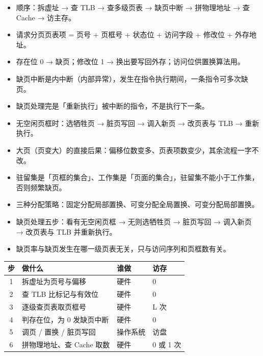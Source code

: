 \documentclass[10pt,a4paper]{ctexart}
\begin{document}
\begin{itemize}

\item 顺序：拆虚址 → 查 TLB → 查多级页表 → 缺页中断 → 拼物理地址 → 查 Cache → 访主存。

\item 请求分页页表项 = 页号 + 页框号 + 状态位 + 访问字段 + 修改位 + 外存地址。

\item 存在位 0 → 缺页；修改位 1 → 换出要写回外存；访问位供置换算法用。

\item 缺页中断是内中断（内部异常），发生在指令执行期间，一条指令可多次缺页。

\item 缺页处理完是「重新执行」被中断的指令，不是执行下一条。

\item 无空闲页框时：选牺牲页 → 脏页写回 → 调入新页 → 改页表与 TLB → 重新执行。

\item 大页（页变大）的直接后果：偏移位数变多、页表项数变少，其余流程一字不改。

\item 驻留集是「页框的集合」、工作集是「页面的集合」，驻留集不能小于工作集，否则频繁缺页。

\item 三种分配策略：固定分配局部置换、可变分配全局置换、可变分配局部置换。

\item 缺页处理五步：看有无空闲页框 → 无则选牺牲页 → 脏页写回 → 调入新页 → 改页表与 TLB 并重新执行。

\item 缺页率与缺页发生在哪一级页表无关，只与访问序列和页框数有关。

\end{itemize}

\begin{center}\small
\begin{tabularx}{\linewidth}{@{}c>{\raggedright\arraybackslash}Xll@{}}
\toprule
步 & 做什么 & 谁做 & 访存 \\
\midrule
1 & 拆虚址为页号与偏移 & 硬件 & 0 \\
2 & 查 TLB 比标记与有效位 & 硬件 & 0 \\
3 & 逐级查页表取页框号 & 硬件 & L 次 \\
4 & 判存在位，为 0 发缺页中断 & 硬件 & 0 \\
5 & 调页 / 置换 / 脏页写回 & 操作系统 & 访盘 \\
6 & 拼物理地址、查 Cache 取数 & 硬件 & 0 或 1 次 \\
\bottomrule
\end{tabularx}
\end{center}
\end{document}
